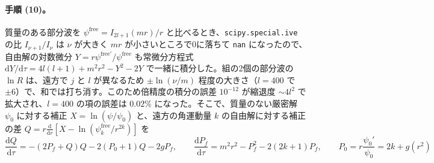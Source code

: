 \documentclass[a4paper,10pt]{ltjsarticle}
\newcommand{\dd}{\mathrm{d}}
\begin{document}
\paragraph{手順 (10)。}質量のある部分波を $\psi^{\mathrm{free}}=I_{2l+1}(mr)/r$ と比べるとき、\texttt{scipy.special.ive} の比 $I_{\nu+1}/I_\nu$ は $\nu$ が大きく $mr$ が小さいところで0に落ちて \texttt{nan} になったので、自由解の対数微分 $Y=r\psi^{\mathrm{free}\prime}/\psi^{\mathrm{free}}$ も常微分方程式 $\dd Y/\dd\tau=4l(l+1)+m^2r^2-Y^2-2Y$ で一緒に積分した。組の2個の部分波の $\ln R$ は、遠方で $j$ と $l$ が異なるため $\pm\ln(\nu/m)$ 程度の大きさ（$l=400$ で $\pm6$）で、和では打ち消す。このため倍精度の積分の誤差 $10^{-12}$ が縮退度 $\sim4l^2$ で拡大され、$l=400$ の項の誤差は $0.02\%$ になった。そこで、質量のない厳密解 $\psi_0$ に対する補正 $X=\ln(\psi/\psi_0)$ と、遠方の角運動量 $k$ の自由解に対する補正の差 $Q=r\frac{\dd}{\dd r}[X-\ln(\psi^{\mathrm{free}}_k/r^{2k})]$ を
\begin{equation*}
\frac{\dd Q}{\dd\tau}=-(2P_f+Q)Q-2(P_0+1)Q-2gP_f,\qquad \frac{\dd P_f}{\dd\tau}=m^2r^2-P_f^2-2(2k+1)P_f,\qquad P_0=r\frac{\psi_0'}{\psi_0}=2k+g(r^2)
\end{equation*}
\end{document}
